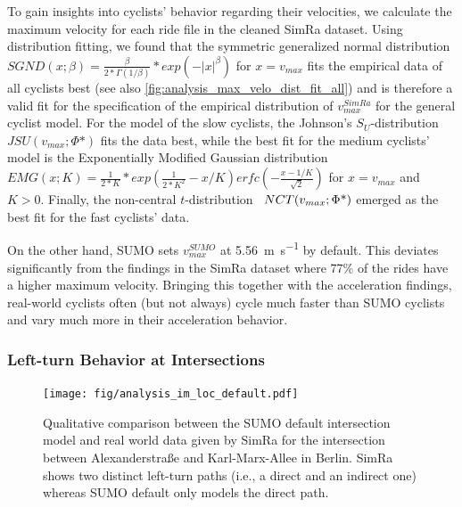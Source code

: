 To gain insights into cyclists' behavior regarding their velocities, we calculate the maximum velocity for each ride file in the cleaned SimRa dataset.
Using distribution fitting, we found that the symmetric generalized normal distribution~\cite{nadarajah2005generalized} $SGND(x;\beta) = \frac{\beta}{2*\Gamma(1/\beta)}*exp(-|x|^\beta)$ for $x=v_{max}$ fits the empirical data of all cyclists best (see also \cref{fig:analysis_max_velo_dist_fit_all}) and is therefore a valid fit for the specification of the empirical distribution of $v_{max}^{SimRa}$ for the general cyclist model.
For the model of the slow cyclists, the Johnson's $S_{U}$-distribution~\cite{johnson1949systems} $JSU(v_{max}; \Phi\mbox{*})$ fits the data best, while the best fit for the medium cyclists' model is the Exponentially Modified Gaussian distribution~\cite{grushka1972characterization} $EMG(x; K) = \frac{1}{2*K}*exp(\frac{1}{2*K^2}-x/K)erfc(-\frac{x-1/K}{\sqrt{2}})$ for $x = v_{max}$ and $K>0$.
Finally, the non-central $t$-distribution~\cite{hogben1961moments} $NCT\newline(v_{max}; \Phi\mbox{*})$ emerged as the best fit for the fast cyclists' data.

On the other hand, SUMO sets $v_{max}^{SUMO}$ at \SI{5.56}{\metre\per\s} by default.
This deviates significantly from the findings in the SimRa dataset where \num{77}\% of the rides have a higher maximum velocity.
Bringing this together with the acceleration findings, real-world cyclists often (but not always) cycle much faster than SUMO cyclists and vary much more in their acceleration behavior.

\subsubsection{Left-turn Behavior at Intersections}
\label{subsubsec:left-turn_behavior_at_intersections_preprocessing}
\begin{figure}[t]
    \centering
    \texttt{[image: fig/analysis\_im\_loc\_default.pdf]}
    \caption{%
        Qualitative comparison between the SUMO default intersection model and real world data given by SimRa for the intersection between Alexanderstraße and Karl-Marx-Allee in Berlin.
        SimRa shows two distinct left-turn paths (i.e., a direct and an indirect one) whereas SUMO default only models the direct path.
    }%
    \label{fig:analysis_im_traj_default}
\end{figure}

